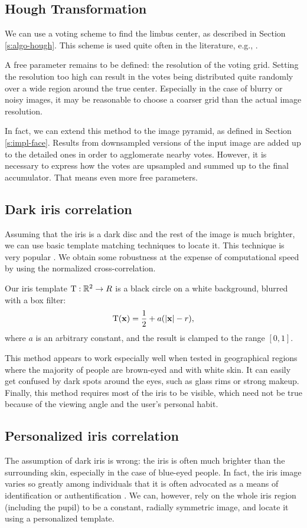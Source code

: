 \subsection{Hough Transformation}
We can use a voting scheme to find the limbus center, as described in Section \ref{s:algo-hough}.
This scheme is used quite often in the literature, e.g., \cite{leo14,zhang13}.

A free parameter remains to be defined: the resolution of the voting grid.
Setting the resolution too high can result in the votes being distributed quite randomly over a wide region around the true center.
Especially in the case of blurry or noisy images, it may be reasonable to choose a coarser grid than the actual image resolution.

In fact, we can extend this method to the image pyramid, as defined in Section \ref{s:impl-face}.
Results from downsampled versions of the input image are added up to the detailed ones in order to agglomerate nearby votes.
However, it is necessary to express how the votes are upsampled and summed up to the final accumulator.
That means even more free parameters.

\subsection{Dark iris correlation}

Assuming that the iris is a dark disc and the rest of the image is much brighter, we can use basic template matching techniques to locate it.
This technique is very popular \cite{zhu12,george16}.
We obtain some robustness at the expense of computational speed by using the normalized cross-correlation.

Our iris template $\mathrm{T}: \mathbb{R}^2 \to R$ is a black circle on a white background, blurred with a box filter:
\begin{equation}
\mathrm{T}(\mathbf{x}) = \frac 1 2 + a(|\mathbf{x}| - r),
\end{equation}
where $a$ is an arbitrary constant, and the result is clamped to the range $[0, 1]$.

This method appears to work especially well when tested in geographical regions where the majority of people are brown-eyed and with white skin.
It can easily get confused by dark spots around the eyes, such as glass rims or strong makeup.
Finally, this method requires most of the iris to be visible, which need not be true because of the viewing angle and the user's personal habit.

\subsection{Personalized iris correlation}
The assumption of dark iris is wrong: the iris is often much brighter than the surrounding skin, especially in the case of blue-eyed people.
In fact, the iris image varies so greatly among individuals that it is often advocated as a means of identification or authentification \cite{bowyer16}.
We can, however, rely on the whole iris region (including the pupil) to be a constant, radially symmetric image, and locate it using a personalized template.

